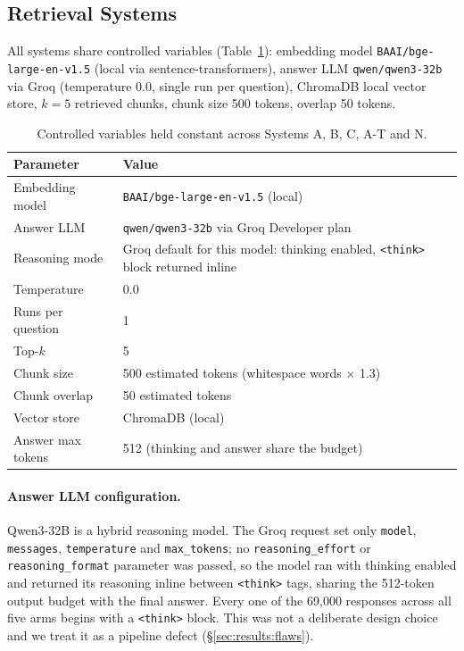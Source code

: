 \subsection{Retrieval Systems}
\label{sec:methods:systems}

All systems share controlled variables (Table~\ref{tab:controlled}):
embedding model \texttt{BAAI/bge-large-en-v1.5} (local via sentence-transformers),
answer LLM \texttt{qwen/qwen3-32b} via Groq (temperature 0.0, single run per question),
ChromaDB local vector store, $k=5$ retrieved chunks, chunk size 500 tokens, overlap 50 tokens.

\begin{table}[htbp]
\centering
\caption{Controlled variables held constant across Systems A, B, C, A-T and N.}
\label{tab:controlled}
\begin{tabular}{ll}
\toprule
Parameter & Value \\
\midrule
Embedding model & \texttt{BAAI/bge-large-en-v1.5} (local) \\
Answer LLM & \texttt{qwen/qwen3-32b} via Groq Developer plan \\
Reasoning mode & Groq default for this model: thinking enabled, \texttt{<think>} block returned inline \\
Temperature & 0.0 \\
Runs per question & 1 \\
Top-$k$ & 5 \\
Chunk size & 500 estimated tokens (whitespace words $\times$ 1.3) \\
Chunk overlap & 50 estimated tokens \\
Vector store & ChromaDB (local) \\
Answer max tokens & 512 (thinking and answer share the budget) \\
\bottomrule
\end{tabular}
\end{table}

\paragraph{Answer LLM configuration.}
Qwen3-32B is a hybrid reasoning model.  The Groq request set only \texttt{model},
\texttt{messages}, \texttt{temperature} and \texttt{max\_tokens}; no
\texttt{reasoning\_effort} or \texttt{reasoning\_format} parameter was passed, so the
model ran with thinking enabled and returned its reasoning inline between
\texttt{<think>} tags, sharing the 512-token output budget with the final answer.  Every
one of the 69,000 responses across all five arms begins with a \texttt{<think>} block.
This was not a deliberate design choice and we treat it as a pipeline defect
(\S\ref{sec:results:flaws}).

